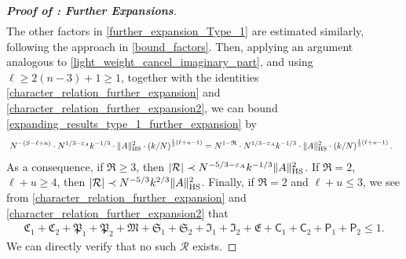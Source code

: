 \documentclass[10pt,reqno]{amsart}
\numberwithin{equation}{section}
\numberwithin{figure}{section}
\theoremstyle{plain} %
\theoremstyle{definition} %
\renewcommand{\txt}[1]{\text{\rm{#1}}}
\newcommand{\cR}{{\mathcal R}}
\newcommand{\fR}{\mathfrak R}
\newcommand{\fC}{\mathfrak C}
\newcommand{\fP}{\mathfrak P}
\newcommand{\fM}{\mathfrak M}
\newcommand{\fS}{\mathfrak S}
\newcommand{\fI}{\mathfrak I}
\newcommand{\fE}{\mathfrak E}
\newcommand{\sC}{\mathsf C}
\newcommand{\sP}{\mathsf P}
\renewcommand{\leq}{\le}
\renewcommand{\geq}{\ge}
\newcommand{\pa}[1]{\left({#1}\right)}
\newcommand{\absa}[1]{\left\lvert #1 \right\rvert}
\newcommand{\norm}[1]{\lVert #1 \rVert}
\newcommand{\HS}{\txt{HS}}
\newcommand{\mm}{\ell}
\numberwithin{equation}{section}
\begin{document}
\begin{proof}[\bf Proof of : Further Expansions]
\begin{equation}
\begin{aligned}
            \end{aligned}
        \end{equation}
    The other factors in \eqref{further_expansion_Type_1} are estimated similarly, following the approach in \eqref{bound_factors}. 
Then, applying an argument analogous to \eqref{light_weight_cancel_imaginary_part}, and using $\mm\geq 2\pa{n-3}+1\geq 1$, together with the identities \eqref{character_relation_further_expansion} and \eqref{character_relation_further_expansion2}, we can bound \eqref{expanding_results_type_1_further_expansion} by
        \begin{equation}\nonumber
            \begin{aligned}
                &~N^{-\pa{S-\mm+n}}\cdot N^{1/3-\varepsilon_A}k^{-1/3}\cdot\norm{A}_{\HS}^2\cdot\pa{k/N }^{\frac 1 3(\mm+u-1)}= N^{1-\fR}\cdot N^{1/3-\varepsilon_A}k^{-1/3}\cdot\norm{A}_{\HS}^2\cdot\pa{k/N}^{\frac13(\mm+u-1)}.
            \end{aligned}
        \end{equation}
        As a consequence, if $\fR\geq 3$, then $\absa{\cR}\prec N^{-5/3-\varepsilon_A}k^{-1/3}\norm{A}_{\HS}^2$. If $\fR=2$, $\mm+u\geq 4$, then $\absa{\cR}\prec N^{-5/3}k^{2/3}\norm{A}_{\HS}^2$. Finally, if $\fR=2$ and $\mm+u\leq 3$, we see from \eqref{character_relation_further_expansion} and \eqref{character_relation_further_expansion2} that
        \begin{equation}\nonumber
            \begin{aligned}
                \fC_1+\fC_2+\fP_1+\fP_2+\fM+\fS_1+\fS_2+\fI_1+\fI_2+\fE+\sC_1+\sC_2+\sP_1+\sP_2\leq 1.
            \end{aligned}
        \end{equation}
    We can directly verify that no such $\cR$ exists.
        

\end{proof}
\end{document}
